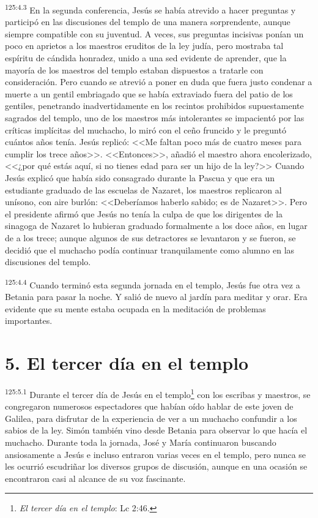 \par 
\textsuperscript{125:4.3} En la segunda conferencia, Jesús se había atrevido a hacer preguntas y participó en las discusiones del templo de una manera sorprendente, aunque siempre compatible con su juventud. A veces, sus preguntas incisivas ponían un poco en aprietos a los maestros eruditos de la ley judía, pero mostraba tal espíritu de cándida honradez, unido a una sed evidente de aprender, que la mayoría de los maestros del templo estaban dispuestos a tratarle con consideración. Pero cuando se atrevió a poner en duda que fuera justo condenar a muerte a un gentil embriagado que se había extraviado fuera del patio de los gentiles, penetrando inadvertidamente en los recintos prohibidos supuestamente sagrados del templo, uno de los maestros más intolerantes se impacientó por las críticas implícitas del muchacho, lo miró con el ceño fruncido y le preguntó cuántos años tenía. Jesús replicó: <<Me faltan poco más de cuatro meses para cumplir los trece años>>. <<Entonces>>, añadió el maestro ahora encolerizado, <<¿por qué estás aquí, si no tienes edad para ser un hijo de la ley?>> Cuando Jesús explicó que había sido consagrado durante la Pascua y que era un estudiante graduado de las escuelas de Nazaret, los maestros replicaron al unísono, con aire burlón: <<Deberíamos haberlo sabido; es de Nazaret>>. Pero el presidente afirmó que Jesús no tenía la culpa de que los dirigentes de la sinagoga de Nazaret lo hubieran graduado formalmente a los doce años, en lugar de a los trece; aunque algunos de sus detractores se levantaron y se fueron, se decidió que el muchacho podía continuar tranquilamente como alumno en las discusiones del templo.

\par 
\textsuperscript{125:4.4} Cuando terminó esta segunda jornada en el templo, Jesús fue otra vez a Betania para pasar la noche. Y salió de nuevo al jardín para meditar y orar. Era evidente que su mente estaba ocupada en la meditación de problemas importantes.

\section*{5. El tercer día en el templo}
\par 
\textsuperscript{125:5.1} Durante el tercer día de Jesús en el templo\footnote{\textit{El tercer día en el templo}: Lc 2:46.} con los escribas y maestros, se congregaron numerosos espectadores que habían oído hablar de este joven de Galilea, para disfrutar de la experiencia de ver a un muchacho confundir a los sabios de la ley. Simón también vino desde Betania para observar lo que hacía el muchacho. Durante toda la jornada, José y María continuaron buscando ansiosamente a Jesús e incluso entraron varias veces en el templo, pero nunca se les ocurrió escudriñar los diversos grupos de discusión, aunque en una ocasión se encontraron casi al alcance de su voz fascinante.

